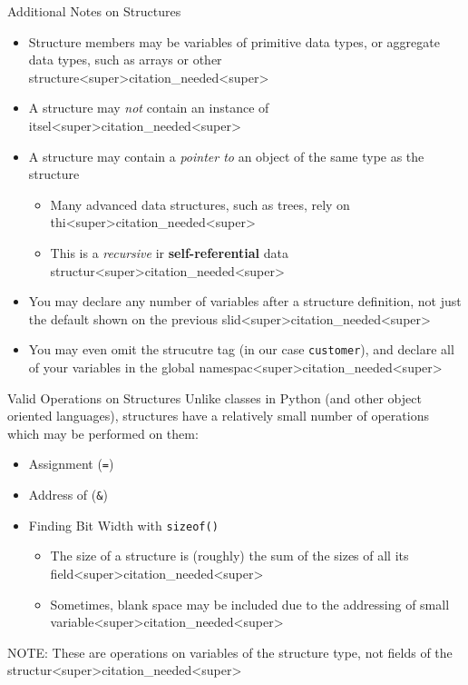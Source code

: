 \documentclass[11pt]{beamer}
\begin{document}
\begin{frame}{Additional Notes on Structures}
\begin{itemize}
\item Structure members may be variables of primitive data types, or aggregate data types, such as arrays or other structure<super>citation_needed<super>
\item A structure may \emph{not} contain an instance of itsel<super>citation_needed<super>
\item A structure may contain a \emph{pointer to} an object of the same type as the structure
\begin{itemize}
\item Many advanced data structures, such as trees, rely on thi<super>citation_needed<super>
\item This is a \textit{recursive} ir \textbf{self-referential} data structur<super>citation_needed<super>
\end{itemize}
\item You may declare any number of variables after a structure definition, not just the default shown on the previous slid<super>citation_needed<super> 
\item You may even omit the strucutre tag (in our case \texttt{customer}), and declare all of your variables in the global namespac<super>citation_needed<super>  
\end{itemize}
\end{frame}

\begin{frame}{Valid Operations on Structures}
Unlike classes in Python (and other object oriented languages), structures have a relatively small number of operations which may be performed on them:
\begin{itemize}
\item Assignment (\texttt{=})
\item Address of (\texttt{\&})
\item Finding Bit Width with \texttt{sizeof()}
\begin{itemize}
\item The size of a structure is (roughly) the sum of the sizes of all its field<super>citation_needed<super>  
\item Sometimes, blank space may be included due to the addressing of small variable<super>citation_needed<super>
\end{itemize}
\end{itemize}
NOTE: These are operations on variables of the structure type, not fields of the structur<super>citation_needed<super>
\end{frame}
\end{document}
